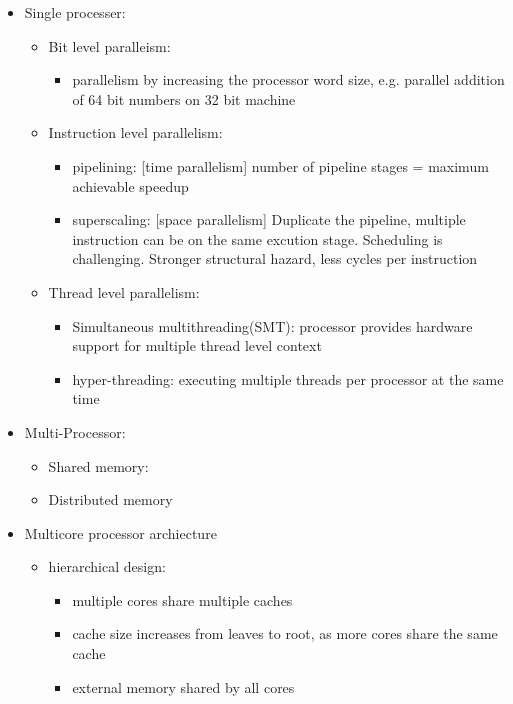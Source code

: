 \documentclass{article}
\begin{document}
\begin{itemize}
    \item Single processer:
    \begin{itemize}
        \item Bit level paralleism:
        \begin{itemize}
            \item parallelism by increasing the processor word size, e.g. parallel addition of 64 bit numbers on 32 bit machine
        \end{itemize}
        \item Instruction level parallelism:
        \begin{itemize}
            \item pipelining: [time parallelism] number of pipeline stages = maximum achievable speedup
            \item superscaling: [space parallelism] Duplicate the pipeline, multiple instruction can be on the same excution stage. Scheduling is challenging. Stronger structural hazard, less cycles per instruction
        \end{itemize}
        \item Thread level parallelism:
        \begin{itemize}
            \item Simultaneous multithreading(SMT): processor provides hardware support for multiple thread level context
            \item hyper-threading: executing multiple threads per processor at the same time
        \end{itemize}
    \end{itemize}
    \item Multi-Processor:
    \begin{itemize}
        \item Shared memory:
        \item Distributed memory
    \end{itemize}
    \item Multicore processor archiecture
    \begin{itemize}
        \item hierarchical design:
        \begin{itemize}
            \item multiple cores share multiple caches
            \item cache size increases from leaves to root, as more cores share the same cache
            \item external memory shared by all cores

\end{itemize}
\end{itemize}
\end{itemize}
\end{document}
